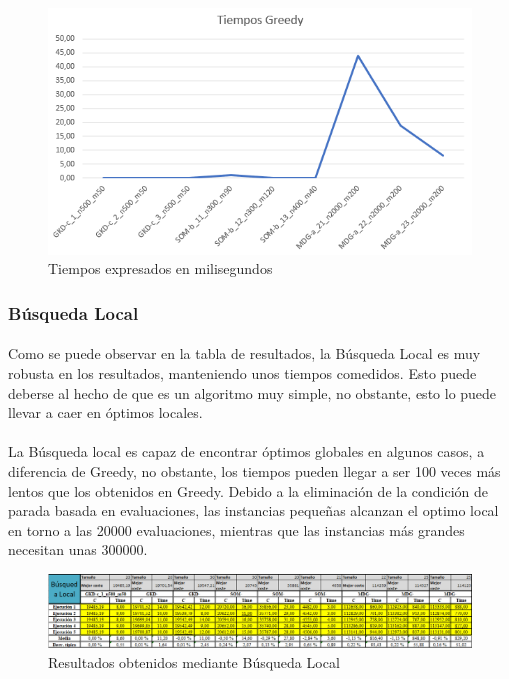 \documentclass{article}
\begin{document}
	\begin{figure}[H]
		
		\centering
		\includegraphics[scale=0.4]{img/TiemposGreedy}
		\caption{Tiempos expresados en milisegundos}
		
	\end{figure}
	
	\subsubsection{Búsqueda Local}
	
	\paragraph{}Como se puede observar en la tabla de resultados, la Búsqueda Local es muy robusta en los resultados, manteniendo unos tiempos comedidos. Esto puede deberse al hecho de que es un algoritmo muy simple, no obstante, esto lo puede llevar a caer en óptimos locales.
	
	\paragraph{}La Búsqueda local es capaz de encontrar óptimos globales en algunos casos, a diferencia de Greedy, no obstante, los tiempos pueden llegar a ser 100 veces más lentos que los obtenidos en Greedy. Debido a la eliminación de la condición de parada basada en evaluaciones, las instancias pequeñas alcanzan el optimo local en torno a las 20000 evaluaciones, mientras que las instancias más grandes necesitan unas 300000.
	
	\begin{figure}[H]
		
		\centering
		\includegraphics[scale=0.4]{img/blocalResult}
		\caption{Resultados obtenidos mediante Búsqueda Local}
		
	\end{figure}
	
\end{document}
